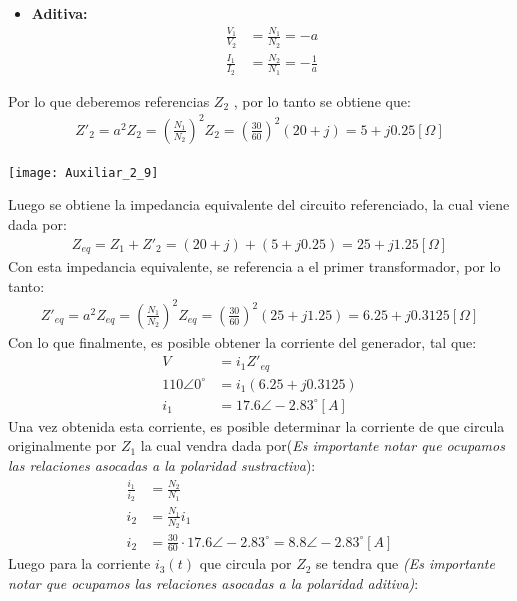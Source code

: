 \documentclass[
  11pt,
  letterpaper,
   addpoints,
   answers
  ]{exam}
\begin{document}
\begin{questions}
\begin{solution}
\begin{itemize}
    \item \textbf{Aditiva:}
    \begin{align}
    \frac{V_1}{V_2} &= \frac{N_1}{N_2} = -a \\
    \frac{I_1}{I_2} &= \frac{N_2}{N_1} = -\frac{1}{a}
    \end{align}
\end{itemize}
Por lo que deberemos referencias $Z_{2}$ , por lo tanto se obtiene que:
\begin{align}
    Z'_{2} = a^{2}Z_{2} = \left(\frac{N_{1}}{N_{2}}\right)^{2}Z_{2} = \left(\frac{30}{60}\right)^{2}(20 + j) = 5 + j0.25 [\Omega]
\end{align}
\begin{center}
    \texttt{[image: Auxiliar\_2\_9]}
\end{center}
Luego se obtiene la impedancia equivalente del circuito referenciado, la cual viene dada por:
\begin{align}
    Z_{eq}= Z_{1} + Z'_{2}= (20+j) + (5+j0.25) = 25 + j1.25 [\Omega]
\end{align}
Con esta impedancia equivalente, se referencia a el primer transformador, por lo tanto:
\begin{align}
    Z'_{eq}= a^{2}Z_{eq}= \left(\frac{N_{1}}{N_{2}}\right)^{2}Z_{eq} = \left(\frac{30}{60}\right)^{2}(25 + j1.25) = 6.25 + j0.3125 [\Omega]
\end{align}
Con lo que finalmente, es posible obtener la corriente del generador, tal que:
\begin{align}
    V &= i_{1}Z'_{eq}\\
    110\angle 0^{\circ} &= i_{1}(6.25 + j0.3125)\\
    i_{1} &= 17.6\angle -2.83^{\circ} [A]
\end{align}
Una vez obtenida esta corriente, es posible determinar la corriente de que circula originalmente por $Z_{1}$ la cual vendra dada por(\textit{Es importante notar que ocupamos las relaciones asocadas a la polaridad sustractiva}):
\begin{align}
    \frac{i_{1}}{i_{2}} &= \frac{N_{2}}{N_{1}}\\
    i_{2} & = \frac{N_{1}}{N_{2}}i_{1}\\
    i_{2} &= \frac{30}{60} \cdot 17.6\angle -2.83^{\circ} = 8.8\angle -2.83^{\circ} [A]
\end{align}
Luego para la corriente $i_{3}(t)$ que circula por $Z_{2}$ se tendra que \textit{(\textit{Es importante notar que ocupamos las relaciones asocadas a la polaridad aditiva})}:
\begin{align}

\end{align}
\end{solution}
\end{questions}
\end{document}
